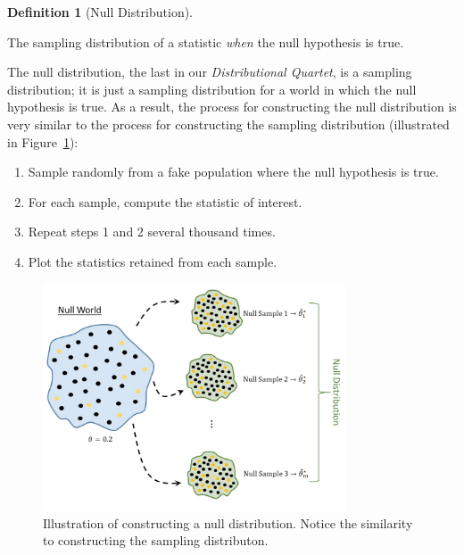 \documentclass[
  letterpaper,
  DIV=11,
  numbers=noendperiod]{scrreprt}
\providecommand{\tightlist}{%
  \setlength{\itemsep}{0pt}\setlength{\parskip}{0pt}}\usepackage{longtable,booktabs,array}
\theoremstyle{definition}
\newtheorem{definition}{Definition}[chapter]
\theoremstyle{definition}
\theoremstyle{plain}
\theoremstyle{remark}
\begin{document}
\begin{definition}[Null
Distribution]\protect\hypertarget{def-null-distribution}{}\label{def-null-distribution}

The sampling distribution of a statistic \emph{when} the null hypothesis
is true.

\end{definition}

The null distribution, the last in our \emph{Distributional Quartet}, is
a sampling distribution; it is just a sampling distribution for a world
in which the null hypothesis is true. As a result, the process for
constructing the null distribution is very similar to the process for
constructing the sampling distribution (illustrated in
Figure~\ref{fig-nulldistns-null-distribution}):

\begin{enumerate}
\def\labelenumi{\arabic{enumi}.}
\tightlist
\item
  Sample randomly from a fake population where the null hypothesis is
  true.
\item
  For each sample, compute the statistic of interest.
\item
  Repeat steps 1 and 2 several thousand times.
\item
  Plot the statistics retained from each sample.
\end{enumerate}

\begin{figure}

{\centering \includegraphics[width=0.8\textwidth,height=\textheight]{./images/NullDistns-Null-Distribution.jpg}

}

\caption{\label{fig-nulldistns-null-distribution}Illustration of
constructing a null distribution. Notice the similarity to constructing
the sampling distributon.}

\end{figure}
\end{document}
